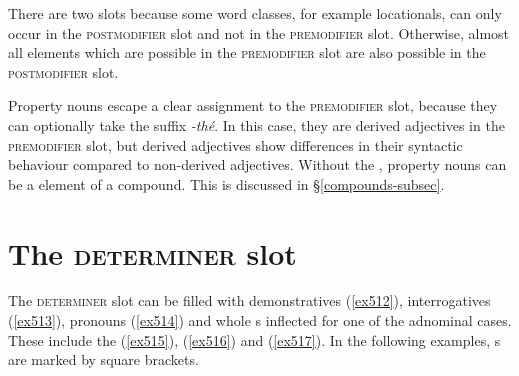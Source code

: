 There are two  slots because some word classes, for example locationals, can only occur in the \textsc{postmodifier} slot and not in the \textsc{premodifier} slot. Otherwise, almost all elements which are possible in the \textsc{premodifier} slot are also possible in the \textsc{postmodifier} slot.

Property nouns escape a clear assignment to the \textsc{premodifier} slot, because they can optionally take the  suffix \emph{-thé}. In this case, they are derived adjectives in the \textsc{premodifier} slot, but derived adjectives show differences in their syntactic behaviour compared to non-derived adjectives. Without the , property nouns can be a  element of a  compound. This is discussed in {\S}\ref{compounds-subsec}.

\section{The \textsc{determiner} slot}\label{npsyntaxdeterminer}

The \textsc{determiner} slot can be filled with demonstratives (\ref{ex512}), interrogatives (\ref{ex513}),  pronouns (\ref{ex514}) and whole s inflected for one of the adnominal cases. These include the  (\ref{ex515}),   (\ref{ex516}) and   (\ref{ex517}). In the following examples, s are marked by square brackets.

